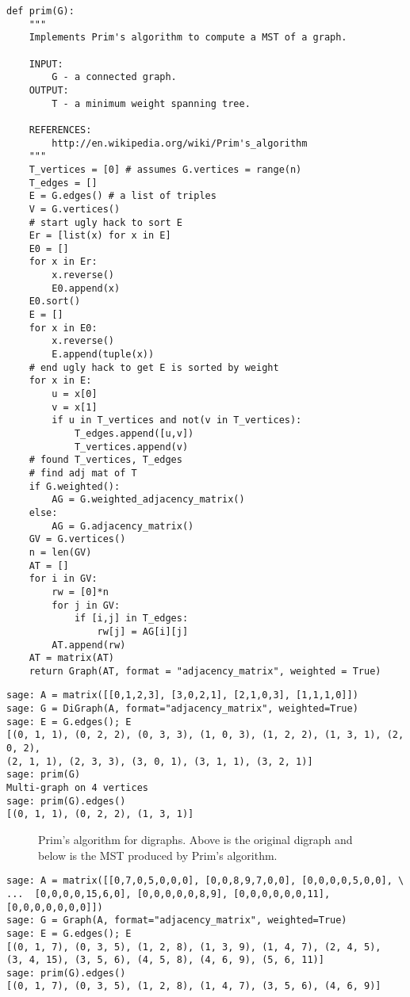 \begin{lstlisting}
def prim(G):
    """
    Implements Prim's algorithm to compute a MST of a graph.

    INPUT:
        G - a connected graph.
    OUTPUT:
        T - a minimum weight spanning tree.

    REFERENCES:
        http://en.wikipedia.org/wiki/Prim's_algorithm
    """
    T_vertices = [0] # assumes G.vertices = range(n)
    T_edges = []
    E = G.edges() # a list of triples
    V = G.vertices()
    # start ugly hack to sort E
    Er = [list(x) for x in E]
    E0 = []
    for x in Er:
        x.reverse()
        E0.append(x)
    E0.sort()
    E = []
    for x in E0:
        x.reverse()
        E.append(tuple(x))
    # end ugly hack to get E is sorted by weight
    for x in E:
        u = x[0]
        v = x[1]
        if u in T_vertices and not(v in T_vertices):
            T_edges.append([u,v])
            T_vertices.append(v)
    # found T_vertices, T_edges
    # find adj mat of T
    if G.weighted():
        AG = G.weighted_adjacency_matrix()
    else:
        AG = G.adjacency_matrix()
    GV = G.vertices()
    n = len(GV)
    AT = []
    for i in GV:
        rw = [0]*n
        for j in GV:
            if [i,j] in T_edges:
                rw[j] = AG[i][j]
        AT.append(rw)
    AT = matrix(AT)
    return Graph(AT, format = "adjacency_matrix", weighted = True)
\end{lstlisting}

\begin{lstlisting}
sage: A = matrix([[0,1,2,3], [3,0,2,1], [2,1,0,3], [1,1,1,0]])
sage: G = DiGraph(A, format="adjacency_matrix", weighted=True)
sage: E = G.edges(); E
[(0, 1, 1), (0, 2, 2), (0, 3, 3), (1, 0, 3), (1, 2, 2), (1, 3, 1), (2, 0, 2),
(2, 1, 1), (2, 3, 3), (3, 0, 1), (3, 1, 1), (3, 2, 1)]
sage: prim(G)
Multi-graph on 4 vertices
sage: prim(G).edges()
[(0, 1, 1), (0, 2, 2), (1, 3, 1)]
\end{lstlisting}

\begin{figure}[!htbp]
\centering

\caption{Prim's algorithm for digraphs. Above is the original digraph
  and below is the MST produced by Prim's algorithm.}
\label{fig:tree-forests:Prim_algorithm_digraph}
\end{figure}

\begin{lstlisting}
sage: A = matrix([[0,7,0,5,0,0,0], [0,0,8,9,7,0,0], [0,0,0,0,5,0,0], \
...  [0,0,0,0,15,6,0], [0,0,0,0,0,8,9], [0,0,0,0,0,0,11], [0,0,0,0,0,0,0]])
sage: G = Graph(A, format="adjacency_matrix", weighted=True)
sage: E = G.edges(); E
[(0, 1, 7), (0, 3, 5), (1, 2, 8), (1, 3, 9), (1, 4, 7), (2, 4, 5),
(3, 4, 15), (3, 5, 6), (4, 5, 8), (4, 6, 9), (5, 6, 11)]
sage: prim(G).edges()
[(0, 1, 7), (0, 3, 5), (1, 2, 8), (1, 4, 7), (3, 5, 6), (4, 6, 9)]
\end{lstlisting}

